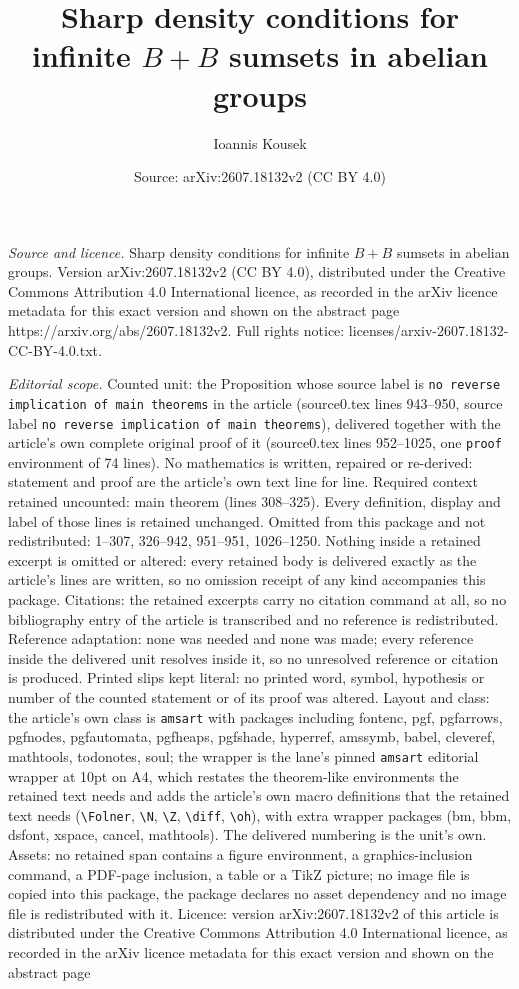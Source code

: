 \documentclass[10pt,a4paper]{amsart}
\title[Sharp density conditions for infinite $B+B$ sumsets in abeli]{Sharp density conditions for infinite $B+B$ sumsets in abelian groups}
\author{Ioannis Kousek}
\date{Source: arXiv:2607.18132v2 (CC BY 4.0)}
\begin{document}
\maketitle

\noindent\emph{Source and licence.} Sharp density conditions for infinite $B+B$ sumsets in abelian groups. Version arXiv:2607.18132v2 (CC BY 4.0), distributed under the Creative Commons Attribution 4.0 International licence, as recorded in the arXiv licence metadata for this exact version and shown on the abstract page https://arxiv.org/abs/2607.18132v2. Full rights notice: licenses/arxiv-2607.18132-CC-BY-4.0.txt.\par\smallskip

\noindent\textit{Editorial scope.} Counted unit: the Proposition whose source label is \texttt{no reverse implication of main theorems} in the article (source0.tex lines 943--950, source label \texttt{no reverse implication of main theorems}), delivered together with the article's own complete original proof of it (source0.tex lines 952--1025, one \texttt{proof} environment of 74 lines). No mathematics is written, repaired or re-derived: statement and proof are the article's own text line for line. Required context retained uncounted: main theorem (lines 308--325). Every definition, display and label of those lines is retained unchanged. Omitted from this package and not redistributed: 1--307, 326--942, 951--951, 1026--1250. Nothing inside a retained excerpt is omitted or altered: every retained body is delivered exactly as the article's lines are written, so no omission receipt of any kind accompanies this package. Citations: the retained excerpts carry no citation command at all, so no bibliography entry of the article is transcribed and no reference is redistributed. Reference adaptation: none was needed and none was made; every reference inside the delivered unit resolves inside it, so no unresolved reference or citation is produced. Printed slips kept literal: no printed word, symbol, hypothesis or number of the counted statement or of its proof was altered. Layout and class: the article's own class is \texttt{amsart} with packages including fontenc, pgf, pgfarrows, pgfnodes, pgfautomata, pgfheaps, pgfshade, hyperref, amssymb, babel, cleveref, mathtools, todonotes, soul; the wrapper is the lane's pinned \texttt{amsart} editorial wrapper at 10pt on A4, which restates the theorem-like environments the retained text needs and adds the article's own macro definitions that the retained text needs (\texttt{\textbackslash Folner}, \texttt{\textbackslash N}, \texttt{\textbackslash Z}, \texttt{\textbackslash diff}, \texttt{\textbackslash oh}), with extra wrapper packages (bm, bbm, dsfont, xspace, cancel, mathtools). The delivered numbering is the unit's own. Assets: no retained span contains a figure environment, a graphics-inclusion command, a PDF-page inclusion, a table or a TikZ picture; no image file is copied into this package, the package declares no asset dependency and no image file is redistributed with it. Licence: version arXiv:2607.18132v2 of this article is distributed under the Creative Commons Attribution 4.0 International licence, as recorded in the arXiv licence metadata for this exact version and shown on the abstract page 
\end{document}
